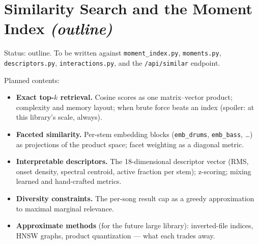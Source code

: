 \chapter{Similarity Search and the Moment Index \emph{(outline)}}\label{ch:similarity}

\begin{incode}
Status: outline. To be written against \texttt{moment\_index.py},
\texttt{moments.py}, \texttt{descriptors.py}, \texttt{interactions.py}, and
the \texttt{/api/similar} endpoint.
\end{incode}

Planned contents:
\begin{itemize}
  \item \textbf{Exact top-$k$ retrieval.} Cosine scores as one matrix--vector
  product; complexity and memory layout; when brute force beats an index
  (spoiler: at this library's scale, always).
  \item \textbf{Faceted similarity.} Per-stem embedding blocks
  (\texttt{emb\_drums}, \texttt{emb\_bass}, \ldots) as projections of the
  product space; facet weighting as a diagonal metric.
  \item \textbf{Interpretable descriptors.} The 18-dimensional
  descriptor vector (RMS, onset density, spectral centroid, active
  fraction per stem); z-scoring; mixing learned and hand-crafted metrics.
  \item \textbf{Diversity constraints.} The per-song result cap as a greedy
  approximation to maximal marginal relevance.
  \item \textbf{Approximate methods} (for the future large library):
  inverted-file indices, HNSW graphs, product quantization --- what each
  trades away.
\end{itemize}
